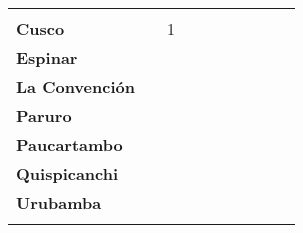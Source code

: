 \begin{tabular}{lccccccccc}
	&\cellcolor[HTML]{FCC46C}
	&\cellcolor[HTML]{FCC46C}
	&\cellcolor[HTML]{FCC46C}
	&\cellcolor[HTML]{FCC46C}
	&\cellcolor[HTML]{FCC46C}
	&\cellcolor[HTML]{FCC46C}\\
	\textbf{Cusco}     													
	&\cellcolor[HTML]{FCC46C}
	&1
	&\cellcolor[HTML]{FCC46C}
	&\cellcolor[HTML]{FCC46C}
	&\cellcolor[HTML]{FCC46C}
	&\cellcolor[HTML]{FCC46C}
	&\cellcolor[HTML]{FCC46C}
	&\cellcolor[HTML]{FCC46C}\\								
	\textbf{Espinar}       					             							
	&\cellcolor[HTML]{FCC46C}					
	&\cellcolor[HTML]{FCC46C}
	&\cellcolor[HTML]{FCC46C}					
	&\cellcolor[HTML]{FCC46C}
	&\cellcolor[HTML]{FCC46C}					
	&\cellcolor[HTML]{FCC46C}
	&\cellcolor[HTML]{FCC46C}
	&\cellcolor[HTML]{FCC46C}\\	
	\textbf{La Convención}      													
	&\cellcolor[HTML]{FCC46C}
	&\cellcolor[HTML]{FCC46C}
	&\cellcolor[HTML]{FCC46C}
	&\cellcolor[HTML]{FCC46C}
	&\cellcolor[HTML]{FCC46C}
	&\cellcolor[HTML]{FCC46C}
	&\cellcolor[HTML]{FCC46C}
	&\cellcolor[HTML]{FCC46C}\\	
	\textbf{Paruro}                            					
	&\cellcolor[HTML]{FCC46C}					
	&\cellcolor[HTML]{FCC46C}					
	&\cellcolor[HTML]{FCC46C}					
	&\cellcolor[HTML]{FCC46C}					
	&\cellcolor[HTML]{FCC46C}
	&\cellcolor[HTML]{FCC46C} 					
	&\cellcolor[HTML]{FCC46C}
	&\cellcolor[HTML]{FCC46C}\\
	\textbf{Paucartambo}               		                       					
	&\cellcolor[HTML]{FCC46C}					
	&\cellcolor[HTML]{FCC46C}
	&\cellcolor[HTML]{FCC46C}					
	&\cellcolor[HTML]{FCC46C}
	&\cellcolor[HTML]{FCC46C}					
	&\cellcolor[HTML]{FCC46C}
	&\cellcolor[HTML]{FCC46C}
	&\cellcolor[HTML]{FCC46C}\\
	\textbf{Quispicanchi}     															
	&\cellcolor[HTML]{FCC46C}
	&\cellcolor[HTML]{FCC46C}
	&\cellcolor[HTML]{FCC46C}
	&\cellcolor[HTML]{FCC46C}
	&\cellcolor[HTML]{FCC46C}
	&\cellcolor[HTML]{FCC46C}
	&\cellcolor[HTML]{FCC46C}
	&\cellcolor[HTML]{FCC46C}\\
	\textbf{Urubamba}  																
	&\cellcolor[HTML]{FCC46C}
	&\cellcolor[HTML]{FCC46C}
	&\cellcolor[HTML]{FCC46C}
	&\cellcolor[HTML]{FCC46C}
	&\cellcolor[HTML]{FCC46C}
	&\cellcolor[HTML]{FCC46C}
	&\cellcolor[HTML]{FCC46C}
	&\cellcolor[HTML]{FCC46C}\\						
	&\multicolumn{1}{l}{}                       &\multicolumn{1}{l}{}            &\multicolumn{1}{l}{}                         
	&\multicolumn{1}{l}{}                       &\multicolumn{1}{l}{}            &\multicolumn{1}{l}{}                       &\multicolumn{1}{l}{}                       &\multicolumn{1}{l}{}            			    
\end{tabular}